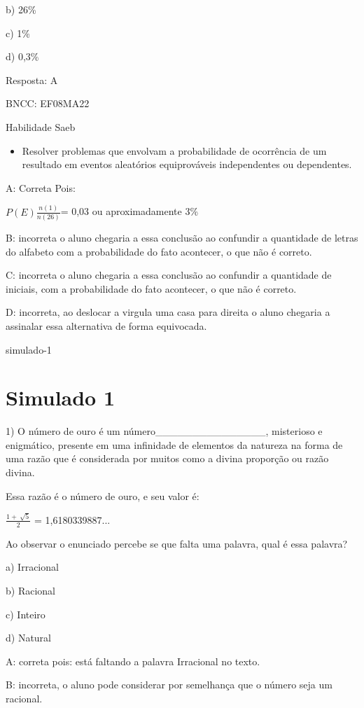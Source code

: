 {b) 26\%

c) 1\%

d) 0,3\%

Resposta: A

BNCC: EF08MA22

Habilidade Saeb

\begin{itemize}
\tightlist
\item
  Resolver problemas que envolvam a probabilidade de ocorrência de um
  resultado em eventos aleatórios equiprováveis independentes ou
  dependentes.
\end{itemize}

A: Correta Pois:

\(P(E)\frac{n(1)}{n(26)}\)= 0,03 ou aproximadamente 3\%

B: incorreta o aluno chegaria a essa conclusão ao confundir a quantidade
de letras do alfabeto com a probabilidade do fato acontecer, o que não é
correto.

C: incorreta o aluno chegaria a essa conclusão ao confundir a quantidade
de iniciais, com a probabilidade do fato acontecer, o que não é correto.

D: incorreta, ao deslocar a virgula uma casa para direita o aluno
chegaria a assinalar essa alternativa de forma equivocada.

simulado-1}{%
\section{Simulado 1}

1) O número de ouro é um número\_\_\_\_\_\_\_\_\_\_\_\_\_\_\_,
misterioso e enigmático, presente em uma infinidade de elementos da
natureza na forma de uma razão que é considerada por muitos como a
divina proporção ou razão divina.

Essa razão é o número de ouro, e seu valor é:

\(\frac{1 + \ \sqrt{5}}{2}\) = 1,6180339887...

Ao observar o enunciado percebe se que falta uma palavra, qual é essa
palavra?

a) Irracional

b) Racional

c) Inteiro

d) Natural

A: correta pois: está faltando a palavra Irracional no texto.

B: incorreta, o aluno pode considerar por semelhança que o número seja
um racional.

}
